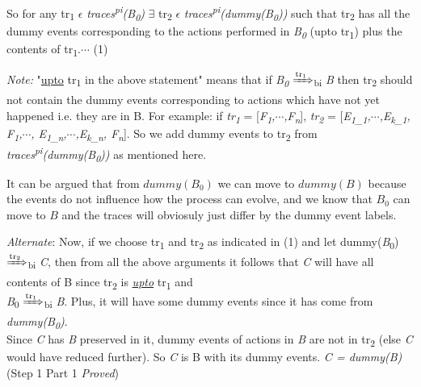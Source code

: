 \documentclass[11pt]{article}
\begin{document}
So for any tr\textsubscript{1} $\epsilon$ {\it traces\textsuperscript{pi}(B\textsubscript{0})} $\exists$ tr\textsubscript{2} $\epsilon$ {\it traces\textsuperscript{pi}(dummy(B\textsubscript{0}))} such that tr\textsubscript{2} has all the dummy events corresponding to the actions performed in {\it B\textsubscript{0}} (upto tr\textsubscript{1}) plus the contents of tr\textsubscript{1}.\hfill \hfill  $\cdots$ (1)\newline

{\it Note:} "\underline{upto} tr\textsubscript{1} in the above statement" means that if  {\it B\textsubscript{0}} {$\xRightarrow[\text{}]{\text{tr\textsubscript{1}}}$}\textsubscript{bi} {\it B} then tr\textsubscript{2} should not contain the dummy events corresponding to actions which have not yet happened i.e. they are in B. For example: if {\it tr\textsubscript{1}} = [{\it F\textsubscript{1},$\cdots$,F\textsubscript{n}}], {\it tr\textsubscript{2}} = [{\it E\textsubscript{1\_1},$\cdots$,E\textsubscript{k\_1}, F\textsubscript{1},$\cdots$, E\textsubscript{1\_n},$\cdots$,E\textsubscript{k\_n}, F\textsubscript{n}}]. So we add dummy events to tr\textsubscript{2} from {\it traces\textsuperscript{pi}(dummy(B\textsubscript{0}))} as mentioned here. \newline

It can be argued that from $dummy(B_0)$ we can move to $dummy(B)$ because the events do not influence how the process can evolve, and we know that $B_0$ can move to $B$ and the traces will obviosuly just differ by the dummy event labels.\newline

{\it Alternate}: Now, if we choose tr\textsubscript{1} and tr\textsubscript{2} as indicated in (1) and let dummy({\it B}\textsubscript{0}) {$\xRightarrow[\text{}]{\text{tr\textsubscript{2}}}$}\textsubscript{bi} {\it C}, then from all the above arguments it follows that {\it C} will have all contents of B since tr\textsubscript{2} is \underline{{\it upto}} tr\textsubscript{1} and \\{\it B}\textsubscript{0} {$\xRightarrow[\text{}]{\text{tr\textsubscript{1}}}$}\textsubscript{bi} {\it B}. Plus, it will have some dummy events since it has come from {\it dummy(B\textsubscript{0})}. \\Since {\it C} has {\it B} preserved in it, dummy events of actions in {\it B} are not in tr\textsubscript{2} (else {\it C} would have reduced further). So {\it C} is B with its dummy events. {\it C = dummy(B)} \hfill \hfill (Step 1 Part 1 {\it Proved})  \newline
\end{document}
